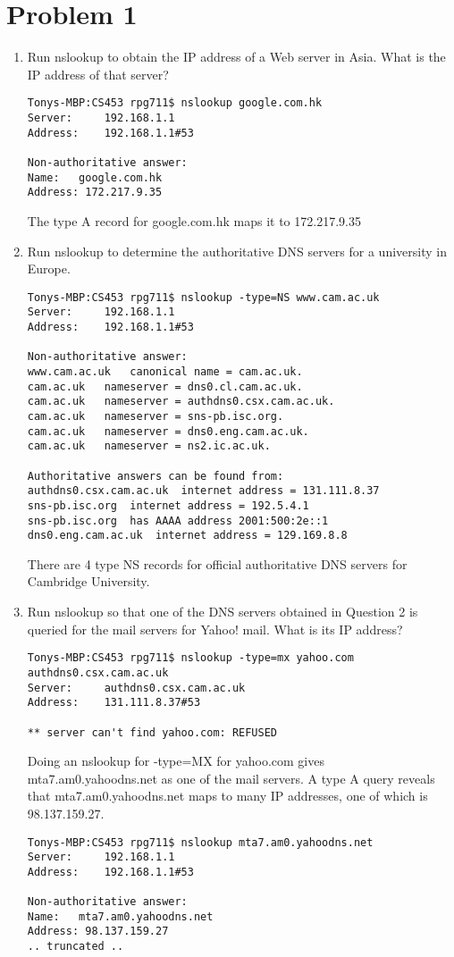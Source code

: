 \documentclass[letter,10pt]{article}
\begin{document}
\section{Problem 1}
\begin{enumerate}

\item Run nslookup to obtain the IP address of a Web server in Asia. What is the IP
address of that server? \\
\begin{verbatim}
Tonys-MBP:CS453 rpg711$ nslookup google.com.hk
Server:		192.168.1.1
Address:	192.168.1.1#53

Non-authoritative answer:
Name:	google.com.hk
Address: 172.217.9.35
\end{verbatim} 
The type A record for google.com.hk maps it to 172.217.9.35

\item Run nslookup to determine the authoritative DNS servers for a university in
Europe.

\begin{verbatim}
Tonys-MBP:CS453 rpg711$ nslookup -type=NS www.cam.ac.uk
Server:		192.168.1.1
Address:	192.168.1.1#53

Non-authoritative answer:
www.cam.ac.uk	canonical name = cam.ac.uk.
cam.ac.uk	nameserver = dns0.cl.cam.ac.uk.
cam.ac.uk	nameserver = authdns0.csx.cam.ac.uk.
cam.ac.uk	nameserver = sns-pb.isc.org.
cam.ac.uk	nameserver = dns0.eng.cam.ac.uk.
cam.ac.uk	nameserver = ns2.ic.ac.uk.

Authoritative answers can be found from:
authdns0.csx.cam.ac.uk	internet address = 131.111.8.37
sns-pb.isc.org	internet address = 192.5.4.1
sns-pb.isc.org	has AAAA address 2001:500:2e::1
dns0.eng.cam.ac.uk	internet address = 129.169.8.8
\end{verbatim}

There are 4 type NS records for official authoritative DNS servers for Cambridge University.

\item Run nslookup so that one of the DNS servers obtained in Question 2 is queried for
the mail servers for Yahoo! mail. What is its IP address?

\begin{verbatim}
Tonys-MBP:CS453 rpg711$ nslookup -type=mx yahoo.com authdns0.csx.cam.ac.uk
Server:		authdns0.csx.cam.ac.uk
Address:	131.111.8.37#53

** server can't find yahoo.com: REFUSED
\end{verbatim}

Doing an nslookup for -type=MX for yahoo.com gives mta7.am0.yahoodns.net as one of the mail servers. A type A query reveals that mta7.am0.yahoodns.net maps to many IP addresses, one of which is 98.137.159.27.

\begin{verbatim}
Tonys-MBP:CS453 rpg711$ nslookup mta7.am0.yahoodns.net
Server:		192.168.1.1
Address:	192.168.1.1#53

Non-authoritative answer:
Name:	mta7.am0.yahoodns.net
Address: 98.137.159.27
.. truncated ..
\end{verbatim}

\end{enumerate}
\end{document}
